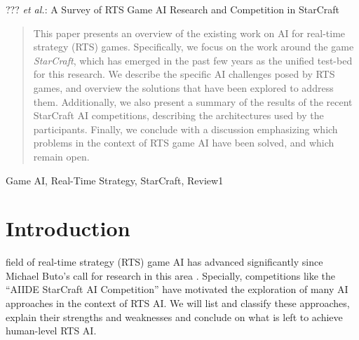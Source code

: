 \documentclass[journal]{IEEEtran}
\begin{document}
%
{??? \MakeLowercase{\textit{et al.}}: A Survey of RTS Game AI Research and Competition in StarCraft}

\maketitle

\begin{abstract}
This paper presents an overview of the existing work on AI for real-time strategy (RTS) games. Specifically, we focus on the work around the game {\em StarCraft}, which has emerged in the past few years as the unified test-bed for this research. We describe the specific AI challenges posed by RTS games, and overview the solutions that have been explored to address them. Additionally, we also present a summary of the results of the recent StarCraft AI competitions, describing the architectures used by the participants. Finally, we conclude with a discussion emphasizing which problems in the context of RTS game AI have been solved, and which remain open.
\end{abstract}

\begin{IEEEkeywords}
Game AI, Real-Time Strategy, StarCraft, Review1

\end{IEEEkeywords}

%
\IEEEpeerreviewmaketitle

\section{Introduction}\label{sec:intro}
 field of real-time strategy (RTS) game AI has advanced significantly since Michael Buto's call for research in this area \cite{Buro03rts}. Specially, competitions like the ``AIIDE StarCraft AI Competition'' have motivated the exploration of many AI approaches in the context of RTS AI. We will list and classify these approaches, explain their 
strengths and weaknesses and conclude on what is left to achieve human-level 
RTS AI.
\end{document}
